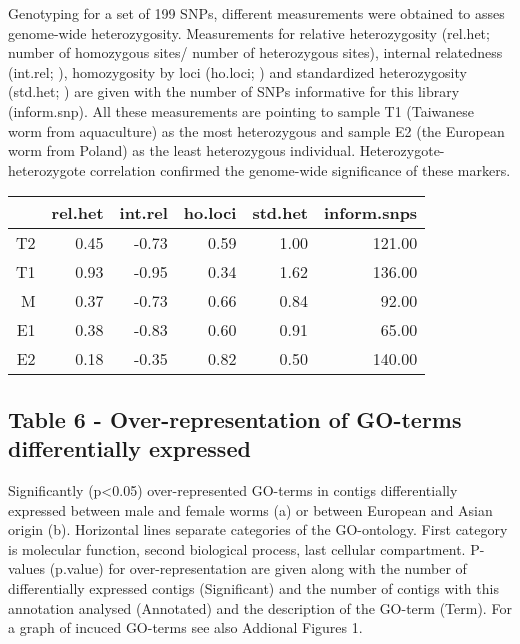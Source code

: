 \documentclass[10pt]{bmc_article}
\newenvironment{bmcformat}{\begin{raggedright}\baselineskip20pt\sloppy\setboolean{publ}{false}}{\end{raggedright}\baselineskip20pt\sloppy}
\begin{document}
\begin{bmcformat}
Genotyping for a set of 199 SNPs, different
measurements were obtained to asses genome-wide
heterozygosity. Measurements for relative heterozygosity (rel.het;
number of homozygous sites/ number of heterozygous sites), internal
relatedness (int.rel; \cite{pmid11571049}), homozygosity by loci
(ho.loci; \cite{pmid17107491}) and standardized heterozygosity
(std.het; \cite{coltman81j}) are given with the number of SNPs
informative for this library (inform.snp). All these measurements are
pointing to sample T1 (Taiwanese worm from aquaculture) as the most
heterozygous and sample E2 (the European worm from Poland) as the
least heterozygous individual. Heterozygote-heterozygote correlation
\cite{pmid21565077} confirmed the genome-wide significance of these
markers.

\begin{table}[ht]
\begin{center}
\begin{tabular}{rrrrrr}
  \hline
 & rel.het & int.rel & ho.loci & std.het & inform.snps \\ 
  \hline
T2 & 0.45 & -0.73 & 0.59 & 1.00 & 121.00 \\ 
  T1 & 0.93 & -0.95 & 0.34 & 1.62 & 136.00 \\ 
  M & 0.37 & -0.73 & 0.66 & 0.84 & 92.00 \\ 
  E1 & 0.38 & -0.83 & 0.60 & 0.91 & 65.00 \\ 
  E2 & 0.18 & -0.35 & 0.82 & 0.50 & 140.00 \\ 
   \hline
\end{tabular}
\end{center}
\end{table}


\subsection*{Table 6 - Over-representation of GO-terms differentially
  expressed}

Significantly (p<0.05) over-represented GO-terms in contigs
differentially expressed between male and female worms (a) or between
European and Asian origin (b). Horizontal lines separate categories of
the GO-ontology. First category is molecular function, second
biological process, last cellular compartment. P-values (p.value) for
over-representation are given along with the number of differentially
expressed contigs (Significant) and the number of contigs with this
annotation analysed (Annotated) and the description of the GO-term
(Term). For a graph of
incuced GO-terms see also Addional Figures 1.\\


\end{bmcformat}
\end{document}

